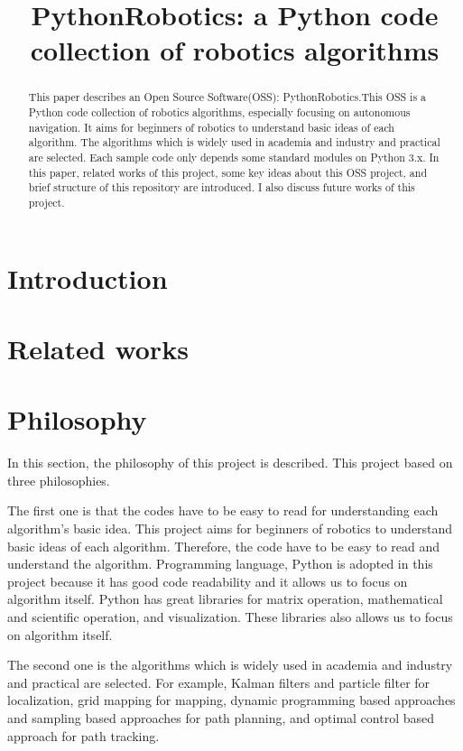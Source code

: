 \documentclass{bmvc2k}
\title{PythonRobotics: a Python code collection of robotics algorithms}
\begin{document}
\maketitle

\begin{abstract}
This paper describes an Open Source Software(OSS): PythonRobotics\cite{github}.This OSS is a Python code collection of robotics algorithms, especially focusing on autonomous navigation. It aims for beginners of robotics to understand basic ideas of each algorithm. The algorithms which is widely used in academia and industry and practical are selected. Each sample code only depends some standard modules on Python 3.x. In this paper, related works of this project, some key ideas about this OSS project, and brief structure of this repository are introduced. I also discuss future works of this project. 

\end{abstract}

\section{Introduction}


\section{Related works}

\section{Philosophy}
In this section, the philosophy of this project is described.
This project based on three philosophies.

The first one is that the codes have to be easy to read for understanding each algorithm's basic idea.
This project aims for beginners of robotics to understand basic ideas of each algorithm. 
Therefore, the code have to be easy to read and understand the algorithm.
Programming language, Python\cite{python} is adopted in this project because it has good code readability and it allows us to focus on algorithm itself.
Python has great libraries for matrix operation, mathematical and scientific operation, and visualization.
These libraries also allows us to focus on algorithm itself.

The second one is the algorithms which is widely used in academia and industry and practical are selected.
For example, Kalman filters and particle filter for localization, grid mapping for mapping, dynamic programming based approaches and sampling based approaches for path planning, and optimal control based approach for path tracking.
\end{document}
